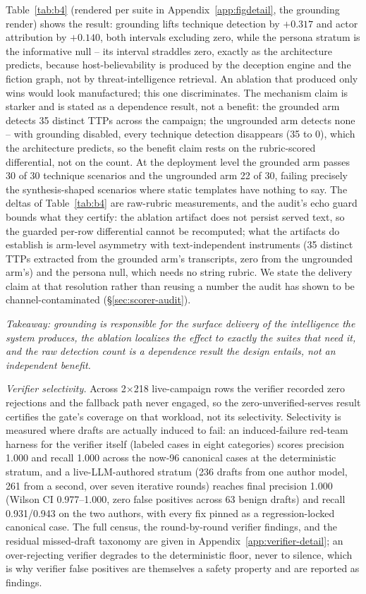 Table~\ref{tab:b4} (rendered per suite in
Appendix~\ref{app:figdetail}, the grounding render) shows the result:
grounding lifts technique detection by $+0.317$ and actor attribution by
$+0.140$, both intervals excluding zero, while the persona stratum is the
informative null -- its interval straddles zero, exactly as the
architecture predicts, because host-believability is produced by the
deception engine and the fiction graph, not by threat-intelligence
retrieval. An ablation that produced only wins would look manufactured;
this one discriminates. The mechanism claim is starker and is stated as a
dependence result, not a benefit: the grounded arm detects 35 distinct
TTPs across the campaign; the ungrounded arm detects none -- with
grounding disabled, every technique detection disappears (35 to 0),
which the architecture predicts, so the benefit claim rests on the
rubric-scored differential, not on the count. At the deployment level the
grounded arm passes 30 of 30 technique scenarios and the ungrounded arm
22 of 30, failing precisely the synthesis-shaped scenarios where static
templates have nothing to say. The deltas of Table~\ref{tab:b4} are
raw-rubric measurements, and the audit's echo guard bounds what they
certify: the ablation artifact does not persist served text, so the
guarded per-row differential cannot be recomputed; what the artifacts do
establish is arm-level asymmetry with text-independent instruments (35
distinct TTPs extracted from the grounded arm's transcripts, zero from
the ungrounded arm's) and the persona null, which needs no string rubric.
We state the delivery claim at that resolution rather than reusing a
number the audit has shown to be channel-contaminated
(\S\ref{sec:scorer-audit}).

\emph{Takeaway: grounding is responsible for the surface delivery of the
intelligence the system produces, the ablation localizes the effect to
exactly the suites that need it, and the raw detection count is a
dependence result the design entails, not an independent benefit.}

\emph{Verifier selectivity.} Across 2$\times$218 live-campaign rows the
verifier recorded zero rejections and the fallback path never engaged, so
the zero-unverified-serves result certifies the gate's coverage on that
workload, not its selectivity. Selectivity is measured where drafts are
actually induced to fail: an induced-failure red-team harness for the
verifier itself (labeled cases in eight categories) scores precision 1.000
and recall 1.000 across the now-96 canonical cases at the deterministic
stratum, and a live-LLM-authored stratum (236 drafts from one author
model, 261 from a second, over seven iterative rounds) reaches final
precision 1.000 (Wilson CI 0.977--1.000, zero false positives across 63
benign drafts) and recall 0.931/0.943 on the two authors, with every
fix pinned as a regression-locked canonical case. The full census, the
round-by-round verifier findings, and the residual missed-draft taxonomy
are given in Appendix~\ref{app:verifier-detail}; an over-rejecting
verifier degrades to the deterministic floor, never to silence, which is
why verifier false positives are themselves a safety property and are
reported as findings.

